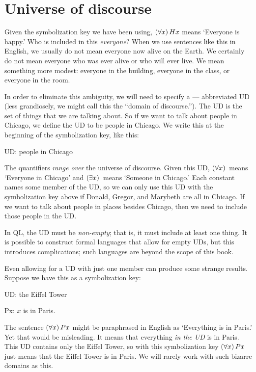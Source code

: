 \section{Universe of discourse}
Given the symbolization key we have been using, $(\forall x) \,Hx$ means `Everyone is happy.' Who is included in this \emph{everyone}? When we use sentences like this in English, we usually do not mean everyone now alive on the Earth. We certainly do not mean everyone who was ever alive or who will ever live. We mean something more modest: everyone in the building, everyone in the class, or everyone in the room.

In order to eliminate this ambiguity, we will need to specify a  --- abbreviated UD {\color{black} (less grandiosely, we might call this the ``domain of discourse.'')}. The UD is the set of things that we are talking about. So if we want to talk about people in Chicago, we define the UD to be people in Chicago. We write this at the beginning of the symbolization key, like this:
\begin{ekey}
\item[UD:] people in Chicago
\end{ekey}
The quantifiers \emph{range over} the universe of discourse. Given this UD, $(\forall x) \,$ means `Everyone in Chicago' and $(\exists x) \,$ means `Someone in Chicago.' Each constant names some member of the UD, so we can only use this UD with the symbolization key above if Donald, Gregor, and Marybeth are all in Chicago. If we want to talk about people in places besides Chicago, then we need to include those people in the UD.

In QL, the UD must be \emph{non-empty}; that is, it must include at least one thing. It is possible to construct formal languages that allow for empty UDs, but this introduces complications; such languages are beyond the scope of this book.

Even allowing for a UD with just one member can produce some strange results. Suppose we have this as a symbolization key:
\begin{ekey}
\item[UD:] the Eiffel Tower
\item[Px:] $x$ is in Paris.
\end{ekey}
The sentence $(\forall x) \, Px$ might be paraphrased in English as `Everything is in Paris.' Yet that would be misleading. It means that everything \emph{in the UD} is in Paris. This UD contains only the Eiffel Tower, so with this symbolization key $(\forall x) \, Px$ just means that the Eiffel Tower is in Paris. We will rarely work with such bizarre domains as this.

